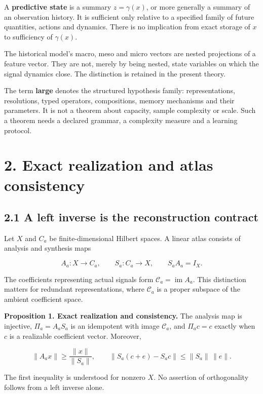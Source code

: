 \documentclass[11pt,letterpaper]{article}
\begin{document}
A \textbf{predictive state} is a summary \(z=\gamma(x)\), or more
generally a summary of an observation history. It is sufficient only
relative to a specified family of future quantities, actions and
dynamics. There is no implication from exact storage of \(x\) to
sufficiency of \(\gamma(x)\).

The historical model's macro, meso and micro vectors are nested
projections of a feature vector. They are not, merely by being nested,
state variables on which the signal dynamics close. The distinction is
retained in the present theory.

The term \textbf{large} denotes the structured hypothesis family:
representations, resolutions, typed operators, compositions, memory
mechanisms and their parameters. It is not a theorem about capacity,
sample complexity or scale. Such a theorem needs a declared grammar, a
complexity measure and a learning protocol.

\section{2. Exact realization and atlas
consistency}\label{exact-realization-and-atlas-consistency}

\subsection{2.1 A left inverse is the reconstruction
contract}\label{a-left-inverse-is-the-reconstruction-contract}

Let \(X\) and \(C_a\) be finite-dimensional Hilbert spaces. A linear
atlas consists of analysis and synthesis maps

\[
A_a:X\longrightarrow C_a,\qquad S_a:C_a\longrightarrow X,
\qquad S_aA_a=I_X.
\]

The coefficients representing actual signals form
\(\mathcal C_a=\operatorname{im}A_a\). This distinction matters for
redundant representations, where \(\mathcal C_a\) is a proper subspace
of the ambient coefficient space.

\textbf{Proposition 1. Exact realization and consistency.} The analysis
map is injective, \(\Pi_a=A_aS_a\) is an idempotent with image
\(\mathcal C_a\), and \(\Pi_ac=c\) exactly when \(c\) is a realizable
coefficient vector. Moreover,

\[
\|A_ax\|\geq \frac{\|x\|}{\|S_a\|},\qquad
\|S_a(c+e)-S_ac\|\leq\|S_a\|\,\|e\|.
\]

The first inequality is understood for nonzero \(X\). No assertion of
orthogonality follows from a left inverse alone.
\end{document}
